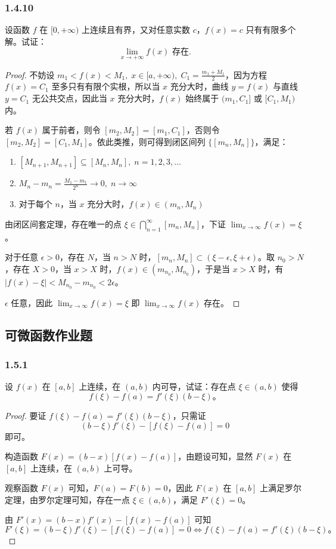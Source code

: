 \documentclass[12pt]{ctexart}
\begin{document}
\subsubsection*{1.4.10}
设函数 $f$ 在 $[0,+\infty)$ 上连续且有界，又对任意实数 $c$，$f(x) = c$ 只有有限多个解。试证：
\[
\lim_{x \to +\infty} f(x) \text{ 存在}.
\]

\begin{proof}
不妨设 $m_1 < f(x) < M_1, \; x \in [a,+\infty), \; C_1 = \frac{m_1 + M_1}{2}$，因为方程 $f(x) = C_1$ 至多只有有限个实根，所以当 $x$ 充分大时，曲线 $y = f(x)$ 与直线 $y = C_1$ 无公共交点，因此当 $x$ 充分大时，$f(x)$ 始终属于 $(m_1, C_1]$ 或 $[C_1, M_1)$ 内。

若 $f(x)$ 属于前者，则令 $[m_2, M_2] = [m_1, C_1]$，否则令 $[m_2, M_2] = [C_1, M_1]$。依此类推，则可得到闭区间列 $\{[m_n, M_n]\}$，满足：
\begin{enumerate}
    \item $[M_{n+1}, M_{n+1}] \subseteq [M_n, M_n], \; n = 1, 2, 3, \ldots$
    \item $M_n - m_n = \frac{M_1 - m_1}{2^n} \to 0, \; n \to \infty$
    \item 对于每个 $n$，当 $x$ 充分大时，$f(x) \in (m_n, M_n)$
\end{enumerate}

由闭区间套定理，存在唯一的点 $\xi \in \bigcap_{n=1}^{\infty} [m_n, M_n]$，下证 $\lim_{x \to \infty} f(x) = \xi$。

对于任意 $\epsilon > 0$，存在 $N$，当 $n > N$ 时，$[m_n, M_n] \subset (\xi - \epsilon, \xi + \epsilon)$。取 $n_0 > N$，存在 $X > 0$，当 $x > X$ 时，$f(x) \in (m_{n_0}, M_{n_0})$，于是当 $x > X$ 时，有 $|f(x) - \xi| < M_{n_0} - m_{n_0} < 2\epsilon$。

$\epsilon$ 任意，因此 $\lim_{x \to \infty} f(x) = \xi$ 即 $\lim_{x \to \infty} f(x)$ 存在。
\end{proof}

\subsection{可微函数作业题}
\subsubsection*{1.5.1}
设 $f(x)$ 在 $[a, b]$ 上连续，在 $(a, b)$ 内可导，试证：存在点 $\xi \in (a, b)$ 使得
\[
f(\xi) - f(a) = f'(\xi)(b - \xi)。
\]
\begin{proof}
要证 $f(\xi) - f(a) = f'(\xi)(b - \xi)$，只需证 
\[
(b - \xi)f'(\xi) - [f(\xi) - f(a)] = 0
\] 
即可。

构造函数 $F(x) = (b - x)[f(x) - f(a)]$，由题设可知，显然 $F(x)$ 在 $[a, b]$ 上连续，在 $(a, b)$ 上可导。

观察函数 $F(x)$ 可知，$F(a) = F(b) = 0$，因此 $F(x)$ 在 $[a, b]$ 上满足罗尔定理，由罗尔定理可知，存在一点 $\xi \in (a, b)$，满足 $F'(\xi) = 0$。

由 $F'(x) = (b - x)f'(x) - [f(x) - f(a)]$ 可知
\[
F'(\xi) = (b - \xi)f'(\xi) - [f(\xi) - f(a)] = 0 \iff f(\xi) - f(a) = f'(\xi)(b - \xi)。
\]
\end{proof}
\end{document}
